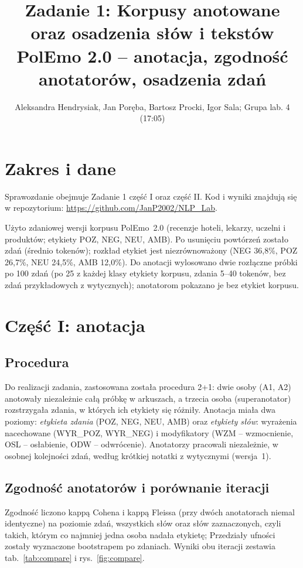 \documentclass[11pt,a4paper]{article}
\title{Zadanie 1: Korpusy anotowane oraz osadzenia słów i tekstów\\[0.3em]
\large PolEmo 2.0 -- anotacja, zgodność anotatorów, osadzenia zdań}
\author{Aleksandra Hendrysiak, Jan Poręba, Bartosz Procki, Igor Sala; Grupa lab. 4 (17:05)}
\date{}
\begin{document}
\maketitle

\section{Zakres i dane}
Sprawozdanie obejmuje Zadanie 1 część I oraz część II.
Kod i wyniki znajdują się w repozytorium:
\url{https://github.com/JanP2002/NLP_Lab}.

Użyto zdaniowej wersji korpusu PolEmo~2.0 (recenzje hoteli, lekarzy, uczelni i produktów; etykiety
POZ, NEG, NEU, AMB). Po usunięciu \corpusDup{} powtórzeń zostało \corpusUnique{} zdań (średnio \corpusMean{}
tokenów); rozkład etykiet jest niezrównoważony (NEG 36,8\%, POZ 26,7\%, NEU 24,5\%, AMB 12,0\%).
Do anotacji wylosowano dwie rozłączne próbki po 100 zdań (po 25 z każdej klasy etykiety korpusu,
zdania 5--40 tokenów, bez zdań przykładowych z wytycznych); anotatorom pokazano je bez etykiet korpusu.

\section{Część I: anotacja}

\subsection{Procedura}

Do realizacji zadania, zastosowana została procedura 2+1: dwie osoby (A1, A2) anotowały niezależnie całą próbkę w arkuszach,
a trzecia osoba (superanotator) rozstrzygała zdania, w których ich etykiety się różniły.
Anotacja miała dwa poziomy: \emph{etykieta zdania} (POZ, NEG, NEU, AMB) oraz \emph{etykiety słów}:
wyrażenia nacechowane (WYR\_POZ, WYR\_NEG) i modyfikatory (WZM -- wzmocnienie, OSL -- osłabienie,
ODW -- odwrócenie). Anotatorzy pracowali niezależnie, w osobnej kolejności zdań, według krótkiej
notatki z wytycznymi (wersja~1).

\subsection{Zgodność anotatorów i porównanie iteracji}\label{sec:iter}

Zgodność liczono kappą Cohena i kappą Fleissa (przy dwóch anotatorach niemal identyczne) na poziomie
zdań, wszystkich słów oraz słów zaznaczonych, czyli takich, którym co najmniej jedna osoba nadała etykietę;
Przedziały ufności zostały wyznaczone bootstrapem po zdaniach. Wyniki obu iteracji zestawia tab.~\ref{tab:compare} i
rys.~\ref{fig:compare}.
\end{document}
